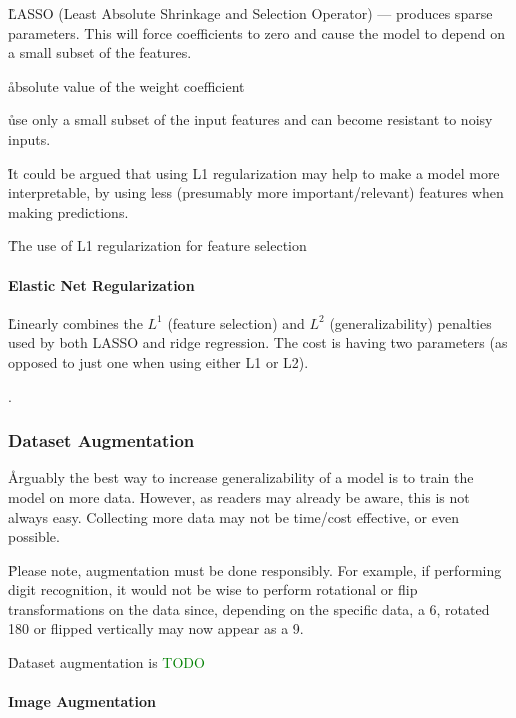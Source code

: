 
\r{LASSO (Least Absolute Shrinkage and Selection Operator) --- produces sparse parameters. This will force coefficients to zero and cause the model to depend on a small subset of the features.}

\r{absolute value of the weight coefficient}

\r{use only a small subset of the input features and can become resistant to noisy inputs.}

\r{It could be argued that using L1 regularization may help to make a model more interpretable, by using less (presumably more important/relevant) features when making predictions.}

\r{The use of L1 regularization for feature selection}


\paragraph{Elastic Net Regularization}

\r{Linearly combines the $L^1$ (feature selection) and $L^2$ (generalizability) penalties used by both LASSO and ridge regression. The cost is having two parameters (as opposed to just one when using either L1 or L2).}

.

\subsubsection{Dataset Augmentation}

\r{Arguably the best way to increase generalizability of a model is to train the model on more data. However, as readers may already be aware, this is not always easy. Collecting more data may not be time/cost effective, or even possible.}

\r{Please note, augmentation must be done responsibly. For example, if performing digit recognition, it would not be wise to perform rotational or flip transformations on the data since, depending on the specific data, a 6, rotated 180 or flipped vertically may now appear as a 9.}

\r{Dataset augmentation is \textcolor{green}{TODO}}

\paragraph{Image Augmentation}



